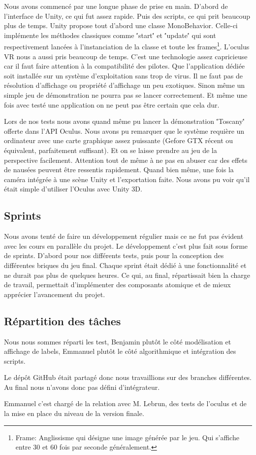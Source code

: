 \documentclass[a4paper,11pt]{myreport}
\begin{document}
\par Nous avons commencé par une longue phase de prise en main. D'abord de l'interface de Unity, ce qui fut assez rapide. Puis des scripts, ce qui prit beaucoup plus de temps.
Unity propose tout d'abord une classe MonoBehavior. Celle-ci implémente les méthodes classiques comme \''start\'' et \''update\'' qui sont respectivement lancées à l'instanciation de la classe et toute les frames\footnote{Frame: Anglissisme qui désigne une image générée par le jeu. Qui s'affiche entre 30 et 60 fois par seconde généralement.}. 
L'oculus VR nous a aussi pris beaucoup de temps. C'est une technologie assez capricieuse car il faut faire attention à la compatibilité des pilotes. Que l'application dédiée soit installée sur un système d'exploitation sans trop de virus. Il ne faut pas de résolution d'affichage ou propriété d'affichage un peu exotiques. Sinon même un simple jeu de démonstration ne pourra pas se lancer correctement.
Et même une fois avec testé une application on ne peut pas être certain que cela dur.
\par Lors de nos tests nous avons quand même pu lancer la démonstration \''Toscany\'' offerte dans l'API Oculus. Nous avons pu remarquer que le système requière un ordinateur avec une carte graphique assez puissante (Gefore GTX récent ou équivalent, parfaitement suffisant). Et on se laisse prendre au jeu de la perspective facilement. Attention tout de même à ne pas en abuser car des effets de nausées peuvent être ressentis rapidement. 
Quand bien même, une fois la caméra intégrée à une scène Unity et l'exportation faite. Nous avons pu voir qu'il était simple d'utiliser l'Oculus avec Unity 3D.
\subsection{Sprints}
\par Nous avons tenté de faire un développement régulier mais ce ne fut pas évident avec les cours en parallèle du projet. Le développement c'est plus fait sous forme de sprints.
D'abord pour nos différents tests, puis pour la conception des différentes briques du jeu final.
Chaque sprint était dédié à une fonctionnalité et ne durait pas plus de quelques heures. Ce qui, au final, répartissait bien la charge de travail, permettait d'implémenter des composants atomique et de mieux apprécier  l'avancement du projet.

\subsection{Répartition des tâches}
\par Nous nous sommes réparti les test, Benjamin plutôt le côté modélisation et affichage de labels, Emmanuel plutôt le côté algorithmique et intégration des scripts.
\par Le dépôt GitHub était partagé donc nous travaillions sur des branches différentes. Au final nous n'avons donc pas défini d'intégrateur.
\par Emmanuel c'est chargé de la relation avec M. Lebrun, des tests de l'oculus et de la mise en place du niveau de la version finale.
\end{document}
